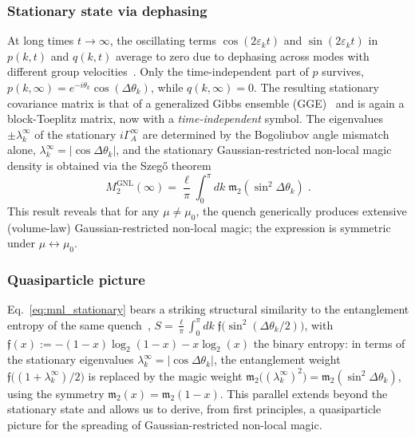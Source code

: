 \documentclass[prx,twocolumn,superscriptaddress,aps,10pt, frontmatterverbose, reprint,footinbib,longbibliography=true]{revtex4-2}
\begin{document}
\subsubsection{Stationary state via dephasing}
At long times $t\to\infty$, the oscillating terms $\cos (2\varepsilon_k t)$ and $\sin(2\varepsilon_k t)$ in $p(k,t)$ and $q(k,t)$ average to zero due to dephasing across modes with different group velocities~\cite{Calabrese2005evolution}.
Only the time-independent part of $p$ survives, $p(k,\infty) = e^{-i\theta_k}\cos(\Delta\theta_k)$, while $q(k,\infty) = 0$.
The resulting stationary covariance matrix is that of a generalized Gibbs ensemble (GGE)~\cite{Calabrese2005evolution,vidmar2017entanglement} and is again a block-Toeplitz matrix, now with a \emph{time-independent} symbol.
The eigenvalues $\pm\lambda_k^\infty$ of the stationary $i\Gamma_A^\infty$ are determined by the Bogoliubov angle mismatch alone, $\lambda_k^\infty=|\cos\Delta\theta_k|$, 
 and the stationary Gaussian-restricted non-local magic density is obtained via the Szeg\H{o} theorem~\cite{Calabrese2005evolution}
\begin{equation}
    M_2^{\mathrm{GNL}}(\infty) = \frac{\ell}{\pi}\int_0^\pi\! dk\; \mathfrak{m}_2\!\left(\sin^2\!\Delta\theta_k\right)\;.
    \label{eq:mnl_stationary}
\end{equation}
This result reveals that for any $\mu\neq \mu_0$, the quench generically produces extensive (volume-law) Gaussian-restricted non-local magic; the expression is symmetric under $\mu \leftrightarrow \mu_0$.

\subsubsection{Quasiparticle picture}
Eq.~\eqref{eq:mnl_stationary} bears a striking structural similarity to the entanglement entropy of the same quench~\cite{Calabrese2005evolution}, $S=\frac{\ell}{\pi} \int_0^\pi\! dk\; \mathfrak{f}\bigl(\sin^2(\Delta\theta_k/2)\bigr)$, with $\mathfrak{f}(x):= -(1-x)\log_2(1-x)-x\log_2(x)$  the binary entropy: in terms of the stationary eigenvalues $\lambda_k^{\infty}=|\cos\Delta\theta_k|$, the entanglement weight $\mathfrak{f}\bigl((1+\lambda_k^{\infty})/2\bigr)$ is replaced by the magic weight $\mathfrak{m}_2\bigl((\lambda_k^{\infty})^2\bigr)=\mathfrak{m}_2(\sin^2\!\Delta\theta_k)$, using the symmetry $\mathfrak{m}_2(x)=\mathfrak{m}_2(1-x)$.
This parallel extends beyond the stationary state and allows us to derive, from first principles, a quasiparticle picture for the spreading of Gaussian-restricted non-local magic.
\end{document}

